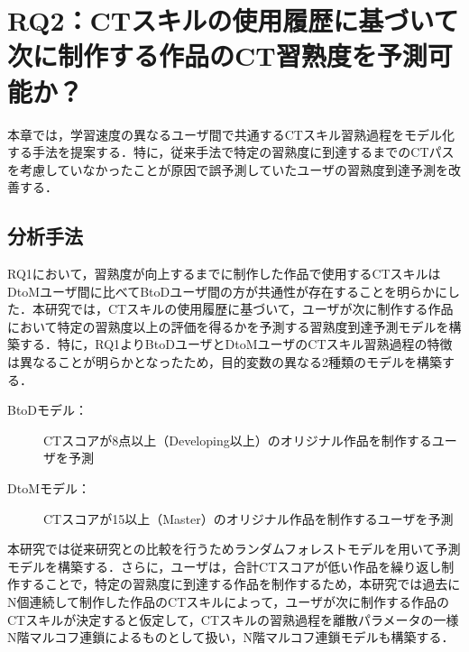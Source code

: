 \documentclass[submit]{ipsj}
\newcommand{\todo}[1]{\colorbox{yellow}{{\bf TODO}:}{\color{red} {\textbf{[#1]}}}}
\begin{document}
\section{RQ2：CTスキルの使用履歴に基づいて次に制作する作品のCT習熟度を予測可能か？}
\label{sec:rq2}

本章では，学習速度の異なるユーザ間で共通するCTスキル習熟過程をモデル化する手法を提案する．特に，従来手法で特定の習熟度に到達するまでのCTパスを考慮していなかったことが原因で誤予測していたユーザの習熟度到達予測を改善する．

\subsection{分析手法}

RQ1において，習熟度が向上するまでに制作した作品で使用するCTスキルはDtoMユーザ間に比べてBtoDユーザ間の方が共通性が存在することを明らかにした．本研究では，CTスキルの使用履歴に基づいて，ユーザが次に制作する作品において特定の習熟度以上の評価を得るかを予測する習熟度到達予測モデルを構築する．特に，RQ1よりBtoDユーザとDtoMユーザのCTスキル習熟過程の特徴は異なることが明らかとなったため，目的変数の異なる2種類のモデルを構築する．
\begin{description}
\item [BtoDモデル：]CTスコアが8点以上（Developing以上）のオリジナル作品を制作するユーザを予測
\item [DtoMモデル：]CTスコアが15以上（Master）のオリジナル作品を制作するユーザを予測
\end{description}



本研究では従来研究との比較を行うためランダムフォレストモデルを用いて予測モデルを構築する．さらに，ユーザは，合計CTスコアが低い作品を繰り返し制作することで，特定の習熟度に到達する作品を制作するため，本研究では過去にN個連続して制作した作品のCTスキルによって，ユーザが次に制作する作品のCTスキルが決定すると仮定して，CTスキルの習熟過程を離散パラメータの一様N階マルコフ連鎖によるものとして扱い，N階マルコフ連鎖モデルも構築する．
\end{document}
